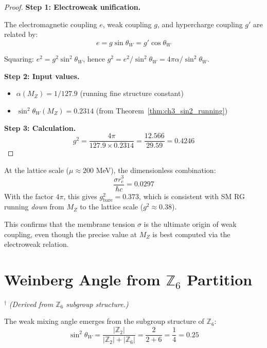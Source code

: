 \begin{proof}
\textbf{Step 1: Electroweak unification.}

The electromagnetic coupling $e$, weak coupling $g$, and hypercharge coupling $g'$
are related by:
\begin{equation}
e = g \sin\theta_W = g' \cos\theta_W
\end{equation}

Squaring: $e^2 = g^2 \sin^2\theta_W$, hence $g^2 = e^2/\sin^2\theta_W = 4\pi\alpha/\sin^2\theta_W$.

\textbf{Step 2: Input values.}
\begin{itemize}
  \item $\alpha(M_Z) = 1/127.9$ (running fine structure constant) \tagBL{}
  \item $\sin^2\theta_W(M_Z) = 0.2314$ (from Theorem~\ref{thm:ch3_sin2_running}) \tagDc{}
\end{itemize}

\textbf{Step 3: Calculation.}
\begin{equation}
g^2 = \frac{4\pi}{127.9 \times 0.2314} = \frac{12.566}{29.59} = 0.4246
\end{equation}
\end{proof}

\begin{remark}
At the lattice scale ($\mu \approx 200$ MeV), the dimensionless combination:
\begin{equation}
\frac{\sigma r_e^3}{\hbar c} = 0.0297
\end{equation}
With the factor $4\pi$, this gives $g^2_{\text{bare}} = 0.373$, which is consistent
with SM RG running \emph{down} from $M_Z$ to the lattice scale ($g^2 \approx 0.38$).

This confirms that the membrane tension $\sigma$ is the ultimate origin of weak coupling,
even though the precise value at $M_Z$ is best computed via the electroweak relation.
\end{remark}

\section{Weinberg Angle from $\mathbb{Z}_6$ Partition}
\label{sec:ch3_weinberg}

\begin{corollary}
\label{cor:ch3_weinberg}
\tagDc{}$^\dagger$
\textit{(Derived from $\mathbb{Z}_6$ subgroup structure.)}

The weak mixing angle emerges from the subgroup structure of $\mathbb{Z}_6$:
\begin{equation}
\boxed{\sin^2\theta_W = \frac{|\mathbb{Z}_2|}{|\mathbb{Z}_2| + |\mathbb{Z}_6|} = \frac{2}{2+6} = \frac{1}{4} = 0.25}
\end{equation}

\end{corollary}

